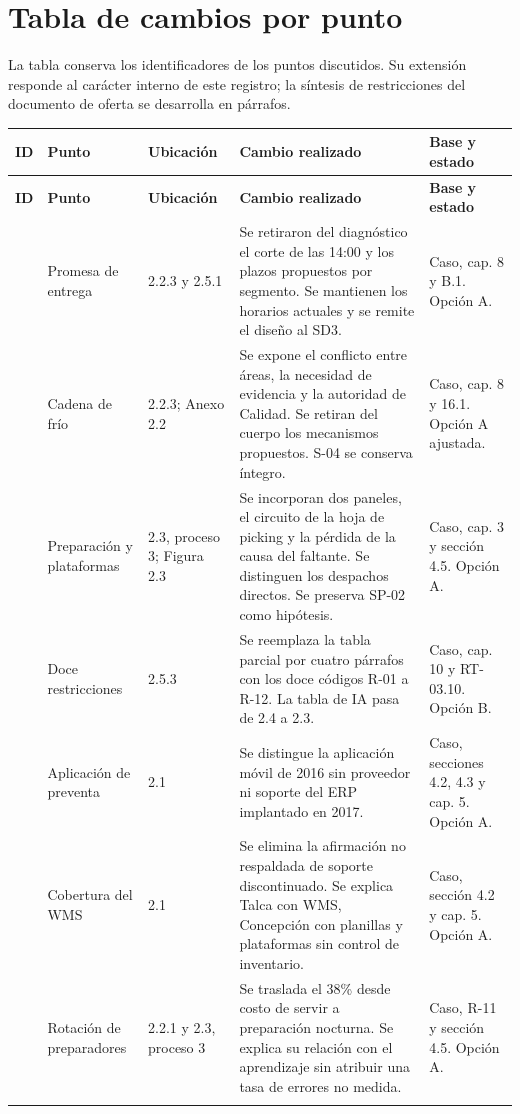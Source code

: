 \documentclass[11pt,letterpaper]{article}
\begin{document}
\section*{Tabla de cambios por punto}
La tabla conserva los identificadores de los puntos discutidos. Su extensión responde al carácter interno de este registro; la síntesis de restricciones del documento de oferta se desarrolla en párrafos.
\small
\begin{longtable}{P{0.55cm}P{2.25cm}P{2.1cm}P{6.1cm}P{4.05cm}}
\toprule
\textbf{ID}&\textbf{Punto}&\textbf{Ubicación}&\textbf{Cambio realizado}&\textbf{Base y estado}\\\midrule
\endfirsthead
\toprule
\textbf{ID}&\textbf{Punto}&\textbf{Ubicación}&\textbf{Cambio realizado}&\textbf{Base y estado}\\\midrule
\endhead
\bottomrule{} & Promesa de entrega & 2.2.3 y 2.5.1 & Se retiraron del diagnóstico el corte de las 14:00 y los plazos propuestos por segmento. Se mantienen los horarios actuales y se remite el diseño al SD3. & Caso, cap. 8 y B.1. Opción A. \\  & Cadena de frío & 2.2.3; Anexo 2.2 & Se expone el conflicto entre áreas, la necesidad de evidencia y la autoridad de Calidad. Se retiran del cuerpo los mecanismos propuestos. S-04 se conserva íntegro. & Caso, cap. 8 y 16.1. Opción A ajustada. \\  & Preparación y plataformas & 2.3, proceso 3; Figura 2.3 & Se incorporan dos paneles, el circuito de la hoja de picking y la pérdida de la causa del faltante. Se distinguen los despachos directos. Se preserva SP-02 como hipótesis. & Caso, cap. 3 y sección 4.5. Opción A. \\  & Doce restricciones & 2.5.3 & Se reemplaza la tabla parcial por cuatro párrafos con los doce códigos R-01 a R-12. La tabla de IA pasa de 2.4 a 2.3. & Caso, cap. 10 y RT-03.10. Opción B. \\  & Aplicación de preventa & 2.1 & Se distingue la aplicación móvil de 2016 sin proveedor ni soporte del ERP implantado en 2017. & Caso, secciones 4.2, 4.3 y cap. 5. Opción A. \\  & Cobertura del WMS & 2.1 & Se elimina la afirmación no respaldada de soporte discontinuado. Se explica Talca con WMS, Concepción con planillas y plataformas sin control de inventario. & Caso, sección 4.2 y cap. 5. Opción A. \\  & Rotación de preparadores & 2.2.1 y 2.3, proceso 3 & Se traslada el 38\% desde costo de servir a preparación nocturna. Se explica su relación con el aprendizaje sin atribuir una tasa de errores no medida. & Caso, R-11 y sección 4.5. Opción A. \\ \addlinespace

\end{longtable}
\end{document}
